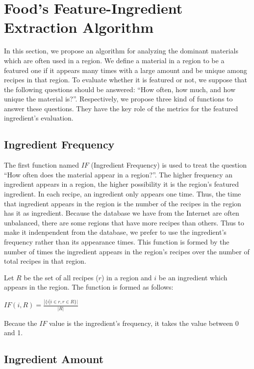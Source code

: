 \chapter{Food's Feature-Ingredient Extraction Algorithm}\label{chap:hustle}

In this section, we propose an algorithm for analyzing the dominant materials which are often used in a region. We define a material in a region to be a featured one if it appears many times with a large amount and be unique among recipes in that region. To evaluate whether it is featured or not, we suppose that the following questions should be answered: ``How often, how much, and how unique the material is?''. Respectively, we propose three kind of functions to answer these questions. They have the key role of the metrics for the featured ingredient's evaluation.  

\section{Ingredient Frequency}

The first function named $IF$ (Ingredient Frequency) is used to treat the question ``How often does the material appear in a region?''. The higher frequency an ingredient appears in a region, the higher possibility it is the region's featured ingredient. In each recipe, an ingredient only appears one time. Thus, the time that ingredient appears in the region is the number of the recipes in the region has it as ingredient. Because the database we have from the Internet are often unbalanced, there are some regions that have more recipes than others. Thus to make it indenpendent from the database, we prefer to use the ingredient's frequency rather than its appearance times. This function is formed by the number of times the ingredient appears in the region's recipes over the number of total recipes in that region.

Let $R$ be the set of all recipes ($r$) in a region and $i$ be an ingredient which appears in the region. The function is formed as follows:
\begin{center}
\smallskip
$ IF(i,R)= \frac{\displaystyle | \{i | i \in r, r \in R \} | }{\displaystyle | R | }$
\smallskip
\end{center}


Becaue the $IF$ value is the ingredient's frequency, it takes the value between 0 and 1.

\section{Ingredient Amount}


